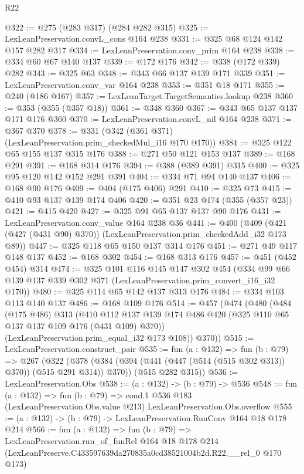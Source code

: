 \begin{lexlean}{R22}
\begin{coremodule}
@322 := @275 (@283 @317) (@284 @282 @315)
@325 := LexLeanPreservation.convL_cons @164 @238
@331 := @325 @68 @124 @142 @157 @282 @317
@334 := LexLeanPreservation.conv_prim @164 @238
@338 := @334 @60 @67 @140 @137
@339 := @172 @176
@342 := @338 (@172 @339) @282
@343 := @325 @63
@348 := @343 @66 @137 @139 @171 @339
@351 := LexLeanPreservation.conv_var @164 @238
@353 := @351 @18 @171
@355 := @240 (@186 @167)
@357 := LexLeanTarget.TargetSemantics.lookup @238
@360 := @353 (@355 (@357 @18))
@361 := @348 @360
@367 := @343 @65 @137 @137 @171 @176 @360
@370 := LexLeanPreservation.convL_nil @164 @238
@371 := @367 @370
@378 := @331 (@342 (@361 @371) (LexLeanPreservation.prim_checkedMul_i16 @170 @170))
@384 := @325 @122 @65 @155 @137 @315 @176
@388 := @271 @50 @121 @153 @137
@389 := @168 @291
@391 := @168 @314 @176
@394 := @388 (@389 @391) @315
@400 := @325 @95 @120 @142 @152 @291 @391
@404 := @334 @71 @94 @140 @137
@406 := @168 @90 @176
@409 := @404 (@175 @406) @291
@410 := @325 @73
@415 := @410 @93 @137 @139 @174 @406
@420 := @351 @23 @174 (@355 (@357 @23))
@421 := @415 @420
@427 := @325 @91 @65 @137 @137 @90 @176
@431 := LexLeanPreservation.conv_value @164 @238 @36
@441 := @400 (@409 (@421 (@427 (@431 @90) @370)) (LexLeanPreservation.prim_checkedAdd_i32 @173 @89))
@447 := @325 @118 @65 @150 @137 @314 @176
@451 := @271 @49 @117 @148 @137
@452 := @168 @302
@454 := @168 @313 @176
@457 := @451 (@452 @454) @314
@474 := @325
    @101
    @116
    @145
    @147
    @302
    @454
    (@334 @99 @66 @139 @137 @339 @302 @371 (LexLeanPreservation.prim_convert_i16_i32 @170))
@480 := @325 @114 @65 @142 @137 @313 @176
@484 := @334 @103 @113 @140 @137
@486 := @168 @109 @176
@514 := @457
    (@474
      (@480
        (@484
          (@175 @486)
          @313
          (@410 @112 @137 @139 @174 @486 @420 (@325 @110 @65 @137 @137 @109 @176 (@431 @109) @370))
          (LexLeanPreservation.prim_equal_i32 @173 @108))
        @370))
@515 := LexLeanPreservation.construct_pair
@535 := fun (a : @132) =>
  fun (b : @79) =>
  @267
    (@322
      (@378 (@384 (@394 (@441 (@447 (@514 (@515 @302 @313)) @370)) (@515 @291 @314)) @370))
      (@515 @282 @315))
@536 := LexLeanPreservation.Obs
@538 := (a : @132) -> (b : @79) -> @536
@548 := fun (a : @132) =>
  fun (b : @79) =>
  cond.{1} @536 @183 (LexLeanPreservation.Obs.value @213) LexLeanPreservation.Obs.overflow
@555 := (a : @132) -> (b : @79) -> LexLeanPreservation.RunConv @164 @18 @178 @214
@566 := fun (a : @132) =>
  fun (b : @79) =>
  LexLeanPreservation.run_of_funRel
    @164
    @18
    @178
    @214
    (LexLeanPreserve.C433597639da270835a0cd38521004b2d.R22.__rel_0 @170 @173)
\end{coremodule}
\end{lexlean}
